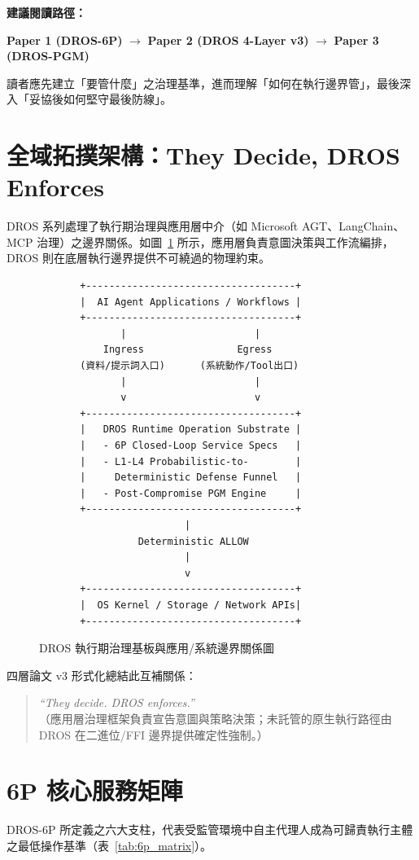 \documentclass[conference]{IEEEtran}
\begin{document}
\textbf{建議閱讀路徑：}
\begin{center}
\textbf{Paper 1 (DROS-6P)} $\longrightarrow$ \textbf{Paper 2 (DROS 4-Layer v3)} $\longrightarrow$ \textbf{Paper 3 (DROS-PGM)}
\end{center}
讀者應先建立「要管什麼」之治理基準，進而理解「如何在執行邊界管」，最後深入「妥協後如何堅守最後防線」。

\section{全域拓撲架構：They Decide, DROS Enforces}
DROS 系列處理了執行期治理與應用層中介（如 Microsoft AGT、LangChain、MCP 治理）之邊界關係。如圖~\ref{fig:topology} 所示，應用層負責意圖決策與工作流編排，DROS 則在底層執行邊界提供不可繞過的物理約束。

\begin{figure}[!t]
\centering
\begin{verbatim}
       +------------------------------------+
       |  AI Agent Applications / Workflows |
       +------------------------------------+
              |                      |
           Ingress                Egress
       (資料/提示詞入口)      (系統動作/Tool出口)
              |                      |
              v                      v
       +------------------------------------+
       |   DROS Runtime Operation Substrate |
       |   - 6P Closed-Loop Service Specs   |
       |   - L1-L4 Probabilistic-to-        |
       |     Deterministic Defense Funnel   |
       |   - Post-Compromise PGM Engine     |
       +------------------------------------+
                         |
                 Deterministic ALLOW
                         |
                         v
       +------------------------------------+
       |  OS Kernel / Storage / Network APIs|
       +------------------------------------+
\end{verbatim}
\caption{DROS 執行期治理基板與應用/系統邊界關係圖}
\label{fig:topology}
\end{figure}

四層論文 v3 形式化總結此互補關係：
\begin{quote}
\textit{``They decide. DROS enforces.''} \\
（應用層治理框架負責宣告意圖與策略決策；未託管的原生執行路徑由 DROS 在二進位/FFI 邊界提供確定性強制。）
\end{quote}

\section{6P 核心服務矩陣}
DROS-6P 所定義之六大支柱，代表受監管環境中自主代理人成為可歸責執行主體之最低操作基準（表~\ref{tab:6p_matrix}）。
\end{document}
